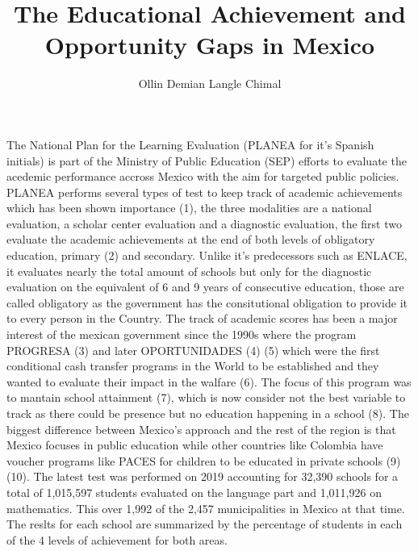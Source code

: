 \documentclass[9pt,twocolumn,twoside,]{pnas-new}
\title{The Educational Achievement and Opportunity Gaps in Mexico}
\author[a]{Ollin Demian Langle Chimal}
\affil[a]{University of Vermont, Complex Systems and Data Science, Burlington,
Vermont, 05401}
\begin{document}
\verticaladjustment{-2pt}

\maketitle
\thispagestyle{firststyle}



The National Plan for the Learning Evaluation (PLANEA for it's Spanish
initials) is part of the Ministry of Public Education (SEP) efforts to
evaluate the acedemic performance accross Mexico with the aim for
targeted public policies. PLANEA performs several types of test to keep
track of academic achievements which has been shown importance (1), the
three modalities are a national evaluation, a scholar center evaluation
and a diagnostic evaluation, the first two evaluate the academic
achievements at the end of both levels of obligatory education, primary
(2) and secondary. Unlike it's predecessors such as ENLACE, it evaluates
nearly the total amount of schools but only for the diagnostic
evaluation on the equivalent of 6 and 9 years of consecutive education,
those are called obligatory as the government has the consitutional
obligation to provide it to every person in the Country. The track of
academic scores has been a major interest of the mexican government
since the 1990s where the program PROGRESA (3) and later OPORTUNIDADES
(4) (5) which were the first conditional cash transfer programs in the
World to be established and they wanted to evaluate their impact in the
walfare (6). The focus of this program was to mantain school attainment
(7), which is now consider not the best variable to track as there could
be presence but no education happening in a school (8). The biggest
difference between Mexico's approach and the rest of the region is that
Mexico focuses in public education while other countries like Colombia
have voucher programs like PACES for children to be educated in private
schools (9) (10). The latest test was performed on 2019 accounting for
32,390 schools for a total of 1,015,597 students evaluated on the
language part and 1,011,926 on mathematics. This over 1,992 of the 2,457
municipalities in Mexico at that time. The reslts for each school are
summarized by the percentage of students in each of the 4 levels of
achievement for both areas.
\end{document}
